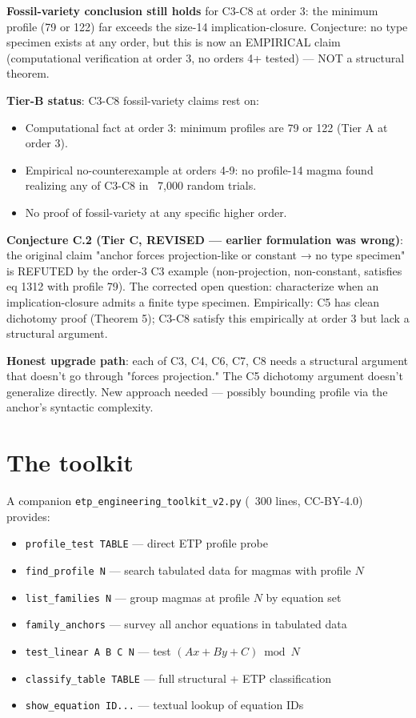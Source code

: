 \documentclass[11pt,reqno]{amsart}
\theoremstyle{plain}
\theoremstyle{definition}
\begin{document}
\textbf{Fossil-variety conclusion still holds} for C3-C8 at order 3: the minimum profile (79 or 122) far exceeds the size-14 implication-closure. Conjecture: no type specimen exists at any order, but this is now an EMPIRICAL claim (computational verification at order 3, no orders 4+ tested) --- NOT a structural theorem.

\textbf{Tier-B status}: C3-C8 fossil-variety claims rest on:
\begin{itemize}
\item Computational fact at order 3: minimum profiles are 79 or 122 (Tier A at order 3).
\item Empirical no-counterexample at orders 4-9: no profile-14 magma found realizing any of C3-C8 in ~7,000 random trials.
\item No proof of fossil-variety at any specific higher order.
\end{itemize}

\textbf{Conjecture C.2 (Tier C, REVISED --- earlier formulation was wrong)}: the original claim "anchor forces projection-like or constant → no type specimen" is REFUTED by the order-3 C3 example (non-projection, non-constant, satisfies eq 1312 with profile 79). The corrected open question: characterize when an implication-closure admits a finite type specimen. Empirically: C5 has clean dichotomy proof (Theorem 5); C3-C8 satisfy this empirically at order 3 but lack a structural argument.

\textbf{Honest upgrade path}: each of C3, C4, C6, C7, C8 needs a structural argument that doesn't go through "forces projection." The C5 dichotomy argument doesn't generalize directly. New approach needed --- possibly bounding profile via the anchor's syntactic complexity.

\section{The toolkit}

A companion \texttt{etp_engineering_toolkit_v2.py} (~300 lines, CC-BY-4.0) provides:
\begin{itemize}
\item \texttt{profile_test TABLE} --- direct ETP profile probe
\item \texttt{find_profile N} --- search tabulated data for magmas with profile $N$
\item \texttt{list_families N} --- group magmas at profile $N$ by equation set
\item \texttt{family_anchors} --- survey all anchor equations in tabulated data
\item \texttt{test_linear A B C N} --- test $(Ax+By+C) \bmod N$
\item \texttt{classify_table TABLE} --- full structural + ETP classification
\item \texttt{show_equation ID...} --- textual lookup of equation IDs
\end{itemize}
\end{document}
